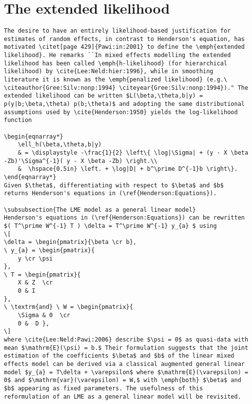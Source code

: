 \documentclass[12pt, a4paper]{article}
\begin{document}
\section{The extended likelihood}
\begin{verbatim}
The desire to have an entirely likelihood-based justification for estimates of random effects, in contrast to Henderson's equation, has motivated \citet[page 429]{Pawi:in:2001} to define the \emph{extended likelihood}. He remarks ``In mixed effects modelling the extended likelihood has been called \emph{h-likelihood} (for hierarchical  likelihood) by \cite{Lee:Neld:hier:1996}, while in smoothing literature it is known as the \emph{penalized likelihood} (e.g.\ \citeauthor{Gree:Silv:nonp:1994} \citeyear{Gree:Silv:nonp:1994})." The extended likelihood can be written $L(\beta,\theta,b|y) = p(y|b;\beta,\theta) p(b;\theta)$ and adopting the same distributional assumptions used by \cite{Henderson:1950} yields the log-likelihood function

\begin{eqnarray*}
	\ell_h(\beta,\theta,b|y)
	& = \displaystyle -\frac{1}{2} \left\{ \log|\Sigma| + (y - X \beta -Zb)'\Sigma^{-1}( y - X \beta -Zb) \right.\\
	&  \hspace{0.5in} \left. + \log|D| + b^\prime D^{-1}b \right\}.
\end{eqnarray*}
Given $\theta$, differentiating with respect to $\beta$ and $b$ returns Henderson's equations in (\ref{Henderson:Equations}).

\subsubsection{The LME model as a general linear model}
Henderson's equations in (\ref{Henderson:Equations}) can be rewritten $( T^\prime W^{-1} T ) \delta = T^\prime W^{-1} y_{a} $ using
\[
\delta = \begin{pmatrix}{\beta \cr b},
\ y_{a} = \begin{pmatrix}{
	y \cr \psi
},
\ T = \begin{pmatrix}{
	X & Z  \cr
	0 & I
},
\ \textrm{and} \ W = \begin{pmatrix}{
	\Sigma & 0  \cr
	0 &  D },
\]
where \cite{Lee:Neld:Pawi:2006} describe $\psi = 0$ as quasi-data with mean $\mathrm{E}(\psi) = b.$ Their formulation suggests that the joint estimation of the coefficients $\beta$ and $b$ of the linear mixed effects model can be derived via a classical augmented general linear model $y_{a} = T\delta + \varepsilon$ where $\mathrm{E}(\varepsilon) = 0$ and $\mathrm{var}(\varepsilon) = W,$ with \emph{both} $\beta$ and $b$ appearing as fixed parameters. The usefulness of this reformulation of an LME as a general linear model will be revisited.

\end{verbatim}
\end{document}
